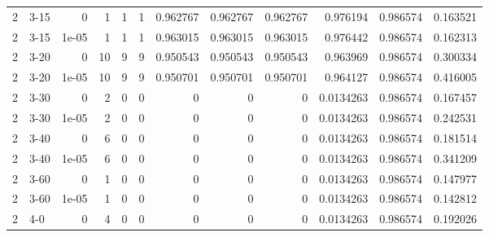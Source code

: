 \begin{tabular}{rlrrrrrrrrrr}
     2 & 3-15   &      0     &           1 &                 1 &                 1 &     0.962767    &     0.962767    &      0.962767    &        0.976194  &               0.986574 &           0.163521 \\
     2 & 3-15   &      1e-05 &           1 &                 1 &                 1 &     0.963015    &     0.963015    &      0.963015    &        0.976442  &               0.986574 &           0.162313 \\
     2 & 3-20   &      0     &          10 &                 9 &                 9 &     0.950543    &     0.950543    &      0.950543    &        0.963969  &               0.986574 &           0.300334 \\
     2 & 3-20   &      1e-05 &          10 &                 9 &                 9 &     0.950701    &     0.950701    &      0.950701    &        0.964127  &               0.986574 &           0.416005 \\
     2 & 3-30   &      0     &           2 &                 0 &                 0 &     0           &     0           &      0           &        0.0134263 &               0.986574 &           0.167457 \\
     2 & 3-30   &      1e-05 &           2 &                 0 &                 0 &     0           &     0           &      0           &        0.0134263 &               0.986574 &           0.242531 \\
     2 & 3-40   &      0     &           6 &                 0 &                 0 &     0           &     0           &      0           &        0.0134263 &               0.986574 &           0.181514 \\
     2 & 3-40   &      1e-05 &           6 &                 0 &                 0 &     0           &     0           &      0           &        0.0134263 &               0.986574 &           0.341209 \\
     2 & 3-60   &      0     &           1 &                 0 &                 0 &     0           &     0           &      0           &        0.0134263 &               0.986574 &           0.147977 \\
     2 & 3-60   &      1e-05 &           1 &                 0 &                 0 &     0           &     0           &      0           &        0.0134263 &               0.986574 &           0.142812 \\
     2 & 4-0    &      0     &           4 &                 0 &                 0 &     0           &     0           &      0           &        0.0134263 &               0.986574 &           0.192026 \\

\end{tabular}
